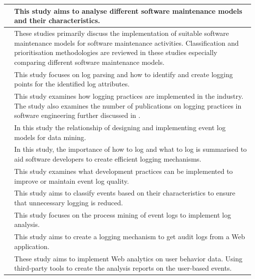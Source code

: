\begin{xltabular}{\linewidth}{|l|X|}
	\hline \cite{Lenarduzzi2017} & This study aims to analyse different software maintenance models and their characteristics. \\

	\hline \cite{Ren2011,Vijayasarathy2016,Araujo2021} & These studies primarily discuss the implementation of suitable software maintenance models for software maintenance activities. Classification and prioritisation methodologies are reviewed in these studies especially \cite{Ren2011} comparing different software maintenance models. \\

	\hline \cite{Zhu2019} & This study focuses on log parsing and how to identify and create logging points for the identified log attributes. \\

	\hline \cite{Rong2018} & This study examines how logging practices are implemented in the industry. The study also examines the number of publications on logging practices in software engineering further discussed in . \\

	\hline \cite{Song2017} & In this study the relationship of designing and implementing event log models for data mining.  \\

	\hline \cite{Zhu2015} & In this study, the importance of how to log and what to log is summarised to aid software developers to create efficient logging mechanisms.  \\

	\hline \cite{Kherbouche2017} & This study examines what development practices can be implemented to improve or maintain event log quality.  \\

	\hline \cite{Fedaghi2010} & This study aims to classify events based on their characteristics to ensure that unnecessary logging is reduced.  \\

	\hline \cite{Jans2012} & This study focuses on the process mining of event logs to implement log analysis.  \\

	\hline \cite{Hasiloglu2018,Slaninova2014,Dhanalakshmi2016} & This study aims to create a logging mechanism to get audit logs from a Web application. \\

	\hline \cite{Kocsis2012,Waqar2017,Paliouras1999} & These study aims to implement Web analytics on user behavior data. Using third-party tools to create the analysis reports on the user-based events.  \\
\end{xltabular}


